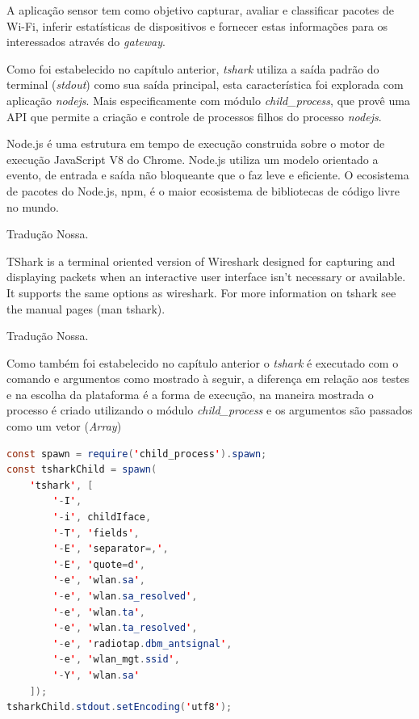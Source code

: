 A aplicação sensor tem como objetivo capturar, avaliar e classificar pacotes de
Wi-Fi, inferir estatísticas de dispositivos e fornecer estas informações para
os interessados através do \emph{gateway}.

Como foi estabelecido no capítulo anterior, \emph{tshark}  utiliza a saída
padrão  do terminal (\emph{stdout}) como sua saída principal, esta
característica foi explorada com aplicação \emph{nodejs}. Mais especificamente
com módulo \emph{child\_process},  que provê uma API que permite a criação e
controle de processos filhos do processo \emph{nodejs}.

\begin{citacao}

	Node.js é uma estrutura em tempo de execução construida sobre o motor de
	execução JavaScript V8 do Chrome. Node.js utiliza um modelo orientado a
	evento, de entrada e saída não bloqueante que o faz leve e eficiente.
	O ecosistema de pacotes do Node.js, npm, é o maior ecosistema de bibliotecas
	de código livre no mundo. \

	 Tradução Nossa.
\end{citacao}

\begin{citacao}

	TShark is a terminal oriented version of Wireshark designed for capturing
	and displaying packets when an interactive user interface isn’t necessary or
	available. It supports the same options as wireshark. For more information
	on tshark see the manual pages (man tshark). \

	 Tradução Nossa.
\end{citacao}


Como também foi estabelecido no capítulo anterior o \emph{tshark} é executado
com o comando e argumentos como mostrado à seguir, a diferença em relação aos
testes e na escolha da plataforma é a forma de execução, na maneira mostrada o
processo é criado utilizando o módulo \emph{child\_process} e os argumentos são
passados como um vetor (\emph{Array})

\begin{lstlisting}[language=java]
const spawn = require('child_process').spawn;
const tsharkChild = spawn(
	'tshark', [
		'-I',
		'-i', childIface,
		'-T', 'fields',
		'-E', 'separator=,',
		'-E', 'quote=d',
		'-e', 'wlan.sa',
		'-e', 'wlan.sa_resolved',
		'-e', 'wlan.ta',
		'-e', 'wlan.ta_resolved',
		'-e', 'radiotap.dbm_antsignal',
		'-e', 'wlan_mgt.ssid',
		'-Y', 'wlan.sa'
	]);
tsharkChild.stdout.setEncoding('utf8');
\end{lstlisting}


